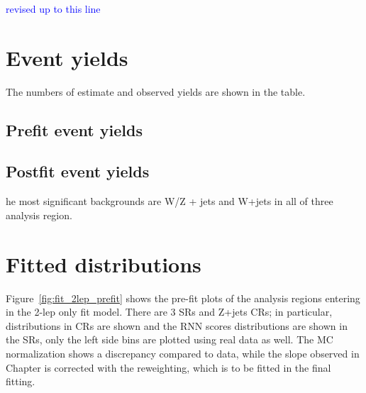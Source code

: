 \textcolor{blue}{revised up to this line}
\section{Event yields}
\label{sec:eventyields}
The numbers of estimate and observed yields are shown in the table.
\subsection{Prefit event yields}
\subsection{Postfit event yields}
he most significant backgrounds are W/Z + jets and W+jets in all of three analysis region.
\section{Fitted distributions}
Figure~\ref{fig:fit_2lep_prefit} shows the pre-fit plots of the analysis regions entering in the 2-lep only fit model. There are 3 SRs and Z+jets CRs;
in particular, \mjjtag distributions in \Zjets CRs are shown and the RNN scores distributions are shown in the SRs, only the left side bins are plotted using real data as well. The MC normalization shows a discrepancy compared to data, while the slope observed in Chapter is corrected with the reweighting, which is to be fitted in the final fitting.

